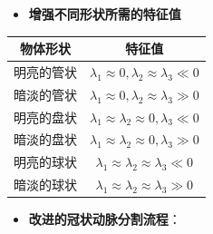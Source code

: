 \begin{frame}
\begin{itemize}
\item \textbf{增强不同形状所需的特征值}
\end{itemize}
\begin{table}[h]
\renewcommand{\arraystretch}{0.5}
\centering
\begin{tabular*}{80mm}{cc}
\toprule
\hspace{5mm} \bfseries \small{物体形状}  & \hspace{15mm}                    \bfseries \small{特征值}                       \\
\midrule
\hspace{5mm} \small{明亮的管状}          & \hspace{15mm}  \small{$\lambda_1 \approx 0, \lambda_2 \approx \lambda_3 \ll 0$} \\
\hspace{5mm} \small{暗淡的管状}          & \hspace{15mm}  \small{$\lambda_1 \approx 0, \lambda_2 \approx \lambda_3 \gg 0$} \\
\hspace{5mm} \small{明亮的盘状}          & \hspace{15mm}  \small{$\lambda_1 \approx \lambda_2 \approx 0, \lambda_3 \ll 0$} \\
\hspace{5mm} \small{暗淡的盘状}          & \hspace{15mm}  \small{$\lambda_1 \approx \lambda_2 \approx 0, \lambda_3 \gg 0$} \\
\hspace{5mm} \small{明亮的球状}          & \hspace{15mm}  \small{$\lambda_1 \approx \lambda_2 \approx \lambda_3 \ll 0$}    \\
\hspace{5mm} \small{暗淡的球状}          & \hspace{15mm}  \small{$\lambda_1 \approx \lambda_2 \approx \lambda_3 \gg 0$}    \\
\bottomrule
\end{tabular*}
\end{table}
\end{frame}

\begin{frame}
\begin{itemize}
  \item \textbf{改进的冠状动脉分割流程}：
\end{itemize}
\begin{figure}[t]
\centering

\end{figure}
\end{frame}

